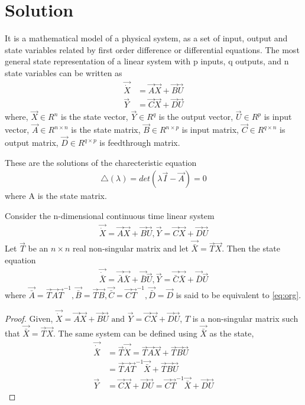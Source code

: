 \documentclass[journal,12pt,twocolumn]{IEEEtran}
\begin{document}
\section{Solution}
\begin{definition}
It is a mathematical model of a physical system, as a set of input, output and state variables related by first order difference or differential equations. The most general state representation of a linear system with p inputs, q outputs, and n state variables can be written as
\begin{align}
    \vec{\dot X}&=\vec{A}\vec{X}+\vec{B}\vec{U}\\
    \vec{Y}&=\vec{C}\vec{X}+\vec{D}\vec{U}
\end{align}
where, $\vec{X}\in R^n$ is the state vector, $\vec{Y}\in R^q$ is the output vector, $\vec{U}\in R^p$ is input vector, $\vec{A}\in R^{n\times n}$ is the state matrix, $\vec{B}\in R^{n\times p}$ is input matrix, $\vec{C}\in R^{q\times n}$ is output matrix, $\vec{D}\in R^{q\times p}$ is feedthrough matrix.
\end{definition}
\begin{definition} 
These are the solutions of the charecteristic equation
\begin{align}
    \triangle(\lambda)=det(\lambda \vec{I}-\vec{A})=0
\end{align}
where A is the state matrix. 
\end{definition}
\begin{theorem}
Consider the n-dimensional continuous time linear system
\begin{align}
    \vec{\dot X}=\vec{A}\vec{X}+\vec{B}\vec{U}, \vec{Y}=\vec{C}\vec{X}+\vec{D}\vec{U}
    \label{eq:org}
\end{align}
Let $\vec{T}$ be an $n\times n$ real non-singular matrix and let $\vec{\bar X}= \vec{T}\vec{X}$. Then the state equation 
\begin{align}
    \vec{\dot{\bar X}}=\vec{\bar A}\vec{\bar X}+ \vec{\bar B}\vec{U}, \vec{Y}=\vec{\bar C}\vec{\bar X}+\vec{\bar D}\vec{U}
    \label{eq:new}
\end{align}
where $\vec{\bar A}=\vec{T}\vec{A}\vec{T}^{-1}, \vec{\bar B}=\vec{T}\vec{B}, \vec{\bar C}=\vec{C}\vec{T}^{-1}, \vec{\bar D}=\vec{D}$ is said to be equivalent to \eqref{eq:org}.
\label{eq:th1}
\end{theorem}
\begin{proof}
Given, $\vec{\dot X}=\vec{A}\vec{X}+\vec{B}\vec{U} \text{ and } \vec{Y}=\vec{C}\vec{X}+\vec{D}\vec{U}$, $T$ is a non-singular matrix such that $\vec{\bar X}= \vec{T}\vec{X}$. The same system can be defined using $\vec{\bar X}$ as the state,
\begin{align}
    \vec{\dot{\bar X}}&=\vec{T}\vec{\dot X}=\vec{T}\vec{A}\vec{X}+\vec{T}\vec{B}\vec{U}\\
    &=\vec{T}\vec{A}\vec{T}^{-1}\vec{\bar X}+\vec{T}\vec{B}\vec{U}\\
    \vec{Y}&=\vec{C}\vec{X}+\vec{D}\vec{U}=\vec{C}\vec{T}^{-1}\vec{\bar X}+\vec{D}\vec{U}
\end{align}
\end{proof}
\end{document}
